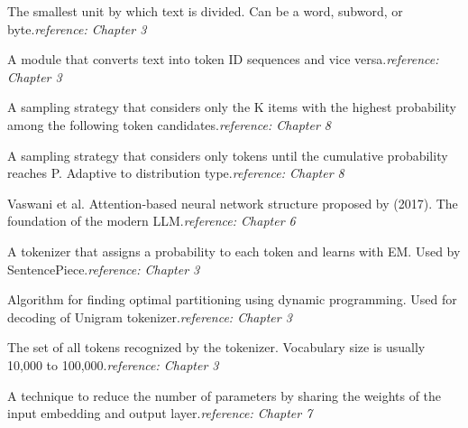 \begin{description}[leftmargin=2.5em, style=nextline, font=\bfseries\sffamily\color{inkblue}]
\item [Token]
The smallest unit by which text is divided. Can be a word, subword, or byte.\textit{reference: Chapter 3}

\item [Tokenizer]
A module that converts text into token ID sequences and vice versa.\textit{reference: Chapter 3}

\item [Top-K Sampling]
A sampling strategy that considers only the K items with the highest probability among the following token candidates.\textit{reference: Chapter 8}

\item [Top-P (Nucleus) Sampling]
A sampling strategy that considers only tokens until the cumulative probability reaches P. Adaptive to distribution type.\textit{reference: Chapter 8}

\item [Transformer]
Vaswani et al. Attention-based neural network structure proposed by (2017). The foundation of the modern LLM.\textit{reference: Chapter 6}

\item [Unigram Tokenizer]
A tokenizer that assigns a probability to each token and learns with EM. Used by SentencePiece.\textit{reference: Chapter 3}

\item [Viterbi Algorithm]
Algorithm for finding optimal partitioning using dynamic programming. Used for decoding of Unigram tokenizer.\textit{reference: Chapter 3}

\item [Vocabulary]
The set of all tokens recognized by the tokenizer. Vocabulary size is usually 10,000 to 100,000.\textit{reference: Chapter 3}

\item [Weight Tying]
A technique to reduce the number of parameters by sharing the weights of the input embedding and output layer.\textit{reference: Chapter 7}

\end{description}
